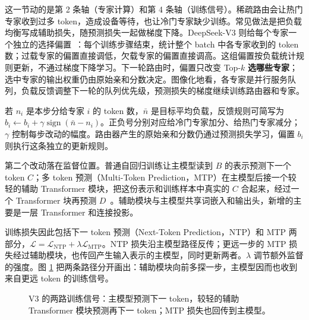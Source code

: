 这一节动的是第 2 条轴（专家计算）和第 4 条轴（训练信号）。稀疏路由会让热门专家收到过多 token，造成设备等待，也让冷门专家缺少训练。常见做法是把负载均衡写成辅助损失，随预测损失一起做梯度下降。DeepSeek-V3 则给每个专家一个独立的选择偏置~\cite{deepseekv3}：每个训练步骤结束，统计整个 batch 中各专家收到的 token 数；过载专家的偏置直接调低，欠载专家的偏置直接调高。这组偏置按负载统计规则更新，不通过梯度下降学习。下一轮路由时，偏置只改变 Top-\(k\) \textbf{选哪些专家}；选中专家的输出权重仍由原始亲和分数决定。图像化地看，各专家是并行服务队列，负载反馈调整下一轮的队列优先级，预测损失的梯度继续训练路由器和专家。

若 \(n_i\) 是本步分给专家 \(i\) 的 token 数，\(\bar n\) 是目标平均负载，反馈规则可简写为 \(b_i\leftarrow b_i+\gamma\operatorname{sign}(\bar n-n_i)\)。正负号分别对应给冷门专家加分、给热门专家减分；\(\gamma\) 控制每步改动的幅度。路由器产生的原始亲和分数仍通过预测损失学习，偏置 \(b_i\) 则执行这条独立的更新规则。

第二个改动落在监督位置。普通自回归训练让主模型读到 \(B\) 的表示预测下一个 token \(C\)；多 token 预测（Multi-Token Prediction，MTP）在主模型后接一个较轻的辅助 Transformer 模块，把这份表示和训练样本中真实的 \(C\) 合起来，经过一个 Transformer 块再预测 \(D\)~\cite{deepseekv3}。辅助模块与主模型共享词嵌入和输出头，新增的主要是一层 Transformer 和连接投影。

训练损失因此包括下一 token 预测（Next-Token Prediction，NTP）和 MTP 两部分，\(\mathcal L=\mathcal L_{\mathrm{NTP}}+\lambda\mathcal L_{\mathrm{MTP}}\)。NTP 损失沿主模型路径反传；更远一步的 MTP 损失经过辅助模块，也传回产生输入表示的主模型，同时更新两者。\(\lambda\) 调节额外监督的强度。图 \ref{fig:deepseek-v3-mtp} 把两条路径分开画出：辅助模块向前多探一步，主模型因而也收到来自更远 token 的训练信号。

\begin{figure}[H]
\centering
{}
\caption{V3 的两路训练信号：主模型预测下一 token，较轻的辅助 Transformer 模块预测再下一 token；MTP 损失也回传到主模型。}
\label{fig:deepseek-v3-mtp}
\end{figure}

